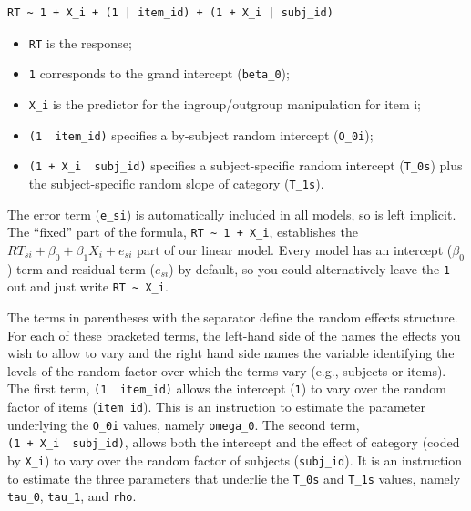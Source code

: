 \documentclass[
  english,
  doc,floatsintext]{apa6}
\providecommand{\tightlist}{%
  \setlength{\itemsep}{0pt}\setlength{\parskip}{0pt}}
\begin{document}
\begin{verbatim}
RT ~ 1 + X_i + (1 | item_id) + (1 + X_i | subj_id)
\end{verbatim}

\begin{itemize}
\tightlist
\item
  \texttt{RT} is the response;
\item
  \texttt{1} corresponds to the grand intercept (\texttt{beta\_0});
\item
  \texttt{X\_i} is the predictor for the ingroup/outgroup manipulation for item i;
\item
  \texttt{(1\ \textbar{}\ item\_id)} specifies a by-subject random intercept (\texttt{O\_0i});
\item
  \texttt{(1\ +\ X\_i\ \textbar{}\ subj\_id)} specifies a subject-specific random intercept (\texttt{T\_0s}) plus the subject-specific random slope of category (\texttt{T\_1s}).
\end{itemize}

\noindent The error term (\texttt{e\_si}) is automatically included in all models, so is left implicit. The \enquote{fixed} part of the formula, \texttt{RT\ \textasciitilde{}\ 1\ +\ X\_i}, establishes the \(RT_{si} + \beta_0 + \beta_1 X_i + e_{si}\) part of our linear model. Every model has an intercept (\(\beta_0\)) term and residual term (\(e_{si}\)) by default, so you could alternatively leave the \texttt{1} out and just write \texttt{RT\ \textasciitilde{}\ X\_i}.

The terms in parentheses with the \texttt{\textbar{}} separator define the random effects structure. For each of these bracketed terms, the left-hand side of the \texttt{\textbar{}} names the effects you wish to allow to vary and the right hand side names the variable identifying the levels of the random factor over which the terms vary (e.g., subjects or items). The first term, \texttt{(1\ \textbar{}\ item\_id)} allows the intercept (\texttt{1}) to vary over the random factor of items (\texttt{item\_id}). This is an instruction to estimate the parameter underlying the \texttt{O\_0i} values, namely \texttt{omega\_0}. The second term, \texttt{(1\ +\ X\_i\ \textbar{}\ subj\_id)}, allows both the intercept and the effect of category (coded by \texttt{X\_i}) to vary over the random factor of subjects (\texttt{subj\_id}). It is an instruction to estimate the three parameters that underlie the \texttt{T\_0s} and \texttt{T\_1s} values, namely \texttt{tau\_0}, \texttt{tau\_1}, and \texttt{rho}.
\end{document}
